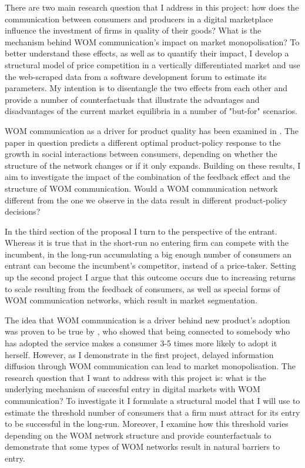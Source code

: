 \documentclass{article}
\numberwithin{figure}{section}
\numberwithin{table}{section}
\theoremstyle{indented}
\numberwithin{equation}{section} %
\begin{document}
There are two main research question that I address in this project: how does the communication between consumers and producers in a digital marketplace influence the investment of firms in quality of their goods? What is the mechanism behind WOM communication's impact on market monopolisation? To better understand these effects, as well as to quantify their impact, I develop a structural model of price competition in a vertically differentiated market and use the web-scraped data from a software development forum to estimate its parameters. My intention is to disentangle the two effects from each other and provide a number of counterfactuals that illustrate the advantages and disadvantages of the current market equilibria in a number of "but-for" scenarios. 

WOM communication as a driver for product quality has been examined in \citet{Godes2017}. The paper in question predicts a different optimal product-policy response to the growth in social interactions between consumers, depending on whether the structure of the network changes or if it only expands. Building on these results, I aim to investigate the impact of the combination of the feedback effect and the structure of WOM communication. Would a WOM communication network different from the one we observe in the data result in different product-policy decisions? 

In the third section of the proposal I turn to the perspective of the entrant. Whereas it is true that in the short-run no entering firm can compete with the incumbent, in the long-run accumulating a big enough number of consumers an entrant can become the incumbent's competitor, instead of a price-taker. Setting up the second project I argue that this outcome occurs due to increasing returns to scale resulting from the feedback of consumers, as well as special forms of WOM communication networks, which result in market segmentation. 

The idea that WOM communication is a driver behind new product's adoption was proven to be true by \citet{Hill2006}, who showed that being connected to somebody who has adopted the service makes a consumer 3-5 times more likely to adopt it herself. However, as I demonstrate in the first project, delayed information diffusion through WOM communication can lead to market monopolisation. The research question that I want to address with this project is: what is the underlying mechanism of succesful entry in digital markets with WOM communication? To investigate it I formulate a structural model that I will use to estimate the threshold number of consumers that a firm must attract for its entry to be successful in the long-run. Moreover, I examine how this threshold varies depending on the WOM network structure and provide counterfactuals to demonstrate that some types of WOM networks result in natural barriers to entry. 
\end{document}
